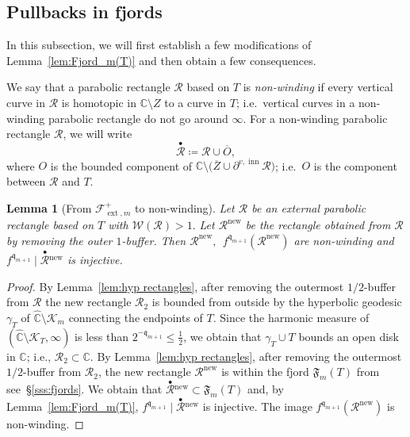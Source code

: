 \documentclass{amsart}
\renewcommand{\sp}{{\ \ }}
\newcommand{\1}{{\mathbb 1 }}
\newcommand{\upbullet}[1]{\overset{\bullet}{ #1}{}}
\newcommand{\ext}{{\operatorname{ext}}}
\newcommand{\Fam}{{\mathcal F}}
\newcommand{\Width}{{\mathcal W}}
\newcommand\RR{\mathcal{R}}
\newcommand{\qq}{\mathfrak{q}}
\newcommand\inn{{\operatorname{inn}}}
\newcommand\new{{\operatorname{new}}}
\newcommand{\wC}{\widehat{\mathbb{C}}}
\newcommand{\C}{\mathbb{C}}
\newtheorem{lem}[thm]{Lemma}
\theoremstyle{remark}
\numberwithin{equation}{section}
\theoremstyle{definition}
\newcommand{\filled}{{\mathcal {K} }}
\newcommand{\Fjord}{{\mathfrak F}}
\begin{document}
 
\subsection{Pullbacks in fjords}
\label{ss:pullbacks curves} In this subsection, we will first establish a few modifications of  Lemma~\ref{lem:Fjord_m(T)} and then obtain a few consequences.


We say that a parabolic rectangle $\RR$ based on $T$ is \emph{non-winding} if every vertical curve in $\RR$ is homotopic in $\C\setminus Z$ to a curve in $T$; i.e.~vertical curves in a non-winding parabolic rectangle do not go around $\infty$.  For a non-winding parabolic rectangle $\RR$, we will write \[\upbullet{ \RR}\coloneqq \RR\cup \overline O,\]
where $O$ is the bounded component of $\C\setminus \big(\overline  Z\cup \partial^{v,\inn} \RR\big)$; i.e.~$O$ is the component between $\RR$ and $T$. 



\begin{lem}[From $\Fam^+_{\ext,m}$ to non-winding]
\label{lem:injecti of diffeo rect}
Let $\RR$ be an external parabolic rectangle based on $T$ with $ \Width(\RR)>1.$ Let $\RR^{\new}$ be the rectangle obtained from $\RR$ by removing the outer $1$-buffer. Then $\RR^{\new},\sp f^{\qq_{m+1}}(\RR^\new)$ are non-winding and $f^{\qq_{m+1}}\mid \upbullet{\RR}^\new$ is injective. 
\end{lem}
\begin{proof}
 By Lemma~\ref{lem:hyp rectangles}, after removing the outermost  $1/2$-buffer from $\RR$ the new rectangle $\RR_2$ is bounded from outside by the hyperbolic geodesic $\gamma_T$ of $\wC\setminus \filled_m$ connecting the endpoints of $T$. Since the harmonic measure of $(\wC\setminus \filled_T, \infty)$ is less than $2^{-\qq_{m+1}}\le \frac12$, we obtain that $\gamma_T\cup T$ bounds an open disk in $\C$; i.e., $\RR_2\subset \C$. By Lemma~\ref{lem:hyp rectangles}, after removing the outermost $1/2$-buffer from $\RR_2$, the new rectangle $\RR^\new$ is within the fjord $\Fjord_m(T)$ from see~\S\ref{sss:fjords}. We obtain that $\upbullet{\RR}^\new\subset \Fjord_m(T)$ and, by Lemma~\ref{lem:Fjord_m(T)}, $f^{\qq_{m+1}}\mid \upbullet{\RR}^\new$ is injective. The image $f^{\qq_{m+1}}(\RR^\new)$ is non-winding.
\end{proof}
\end{document}
